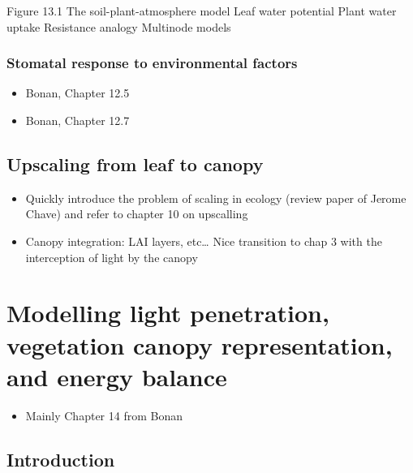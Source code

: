\documentclass[
  oneside]{book}
\providecommand{\tightlist}{%
  \setlength{\itemsep}{0pt}\setlength{\parskip}{0pt}}
\begin{document}
Figure 13.1
The soil-plant-atmosphere model
Leaf water potential
Plant water uptake
Resistance analogy
Multinode models

\hypertarget{stomatal-response-to-environmental-factors}{%
\subsection{Stomatal response to environmental factors}\label{stomatal-response-to-environmental-factors}}

\begin{itemize}
\tightlist
\item
  Bonan, Chapter 12.5
\item
  Bonan, Chapter 12.7
\end{itemize}

\hypertarget{upscaling-from-leaf-to-canopy}{%
\section{Upscaling from leaf to canopy}\label{upscaling-from-leaf-to-canopy}}

\begin{itemize}
\tightlist
\item
  Quickly introduce the problem of scaling in ecology (review paper of Jerome Chave) and refer to chapter 10 on upscalling
\item
  Canopy integration: LAI layers, etc\ldots{} Nice transition to chap 3 with the interception of light by the canopy
\end{itemize}

\hypertarget{modelling-light-penetration-vegetation-canopy-representation-and-energy-balance}{%
\chapter{Modelling light penetration, vegetation canopy representation, and energy balance}\label{modelling-light-penetration-vegetation-canopy-representation-and-energy-balance}}


\begin{itemize}
\tightlist
\item
  Mainly Chapter 14 from Bonan
\end{itemize}

\hypertarget{introduction}{%
\section{Introduction}\label{introduction}}
\end{document}

